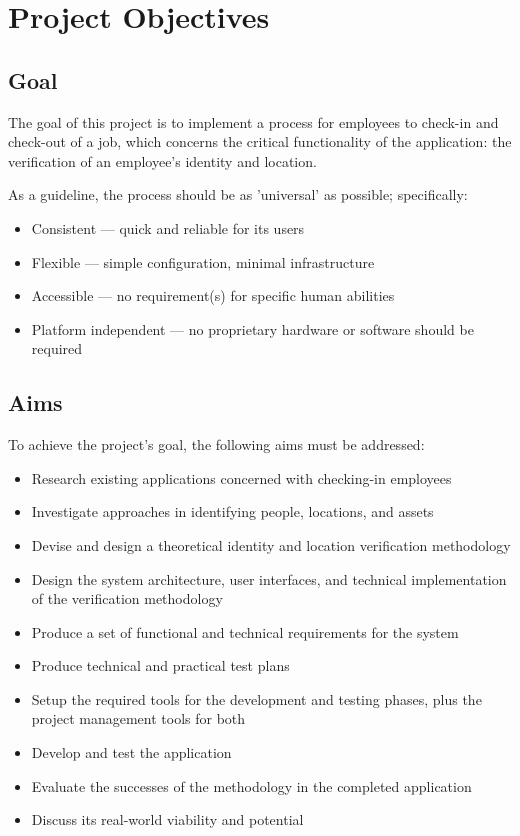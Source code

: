 \section{Project Objectives}

\subsection{Goal} \label{ss:goal}
The goal of this project is to implement a process for
employees to \gls{check-in} and \gls{check-out} of a job,
which concerns the critical functionality of the
application: the verification of an employee's identity and
location.

As a guideline, the process should be as 'universal' as
possible; specifically:

\begin{itemize}
  \item Consistent --- quick and reliable for its users
  \item Flexible --- simple configuration, minimal
        infrastructure
  \item Accessible --- no requirement(s) for specific
        human abilities
  \item Platform independent --- no proprietary hardware
        or software should be required
\end{itemize}

\subsection{Aims}
To achieve the project's goal, the following aims must be
addressed:

\begin{itemize}
  \item Research existing applications concerned with
        checking-in employees
  \item Investigate approaches in identifying people,
        locations, and assets
  \item Devise and design a theoretical identity and
        location verification methodology
  \item Design the system architecture, user interfaces,
        and technical implementation of the
        verification methodology
  \item Produce a set of functional and technical
        requirements for the system
  \item Produce technical and practical test plans
  \item Setup the required tools for the development and
        testing phases, plus the project management tools
        for both
  \item Develop and test the application
  \item Evaluate the successes of the methodology in the
        completed application
  \item Discuss its real-world viability and potential
\end{itemize}